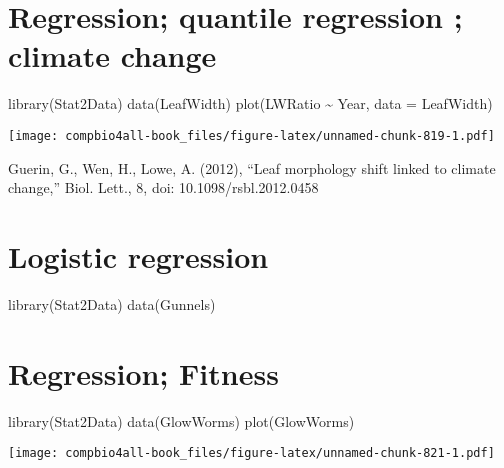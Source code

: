 \documentclass[
]{book}
\newenvironment{Shaded}{\begin{snugshade}}{\end{snugshade}}
\newcommand{\AttributeTok}[1]{\textcolor[rgb]{0.77,0.63,0.00}{#1}}
\newcommand{\FunctionTok}[1]{\textcolor[rgb]{0.00,0.00,0.00}{#1}}
\newcommand{\NormalTok}[1]{#1}
\newcommand{\SpecialCharTok}[1]{\textcolor[rgb]{0.00,0.00,0.00}{#1}}
\begin{document}
\hypertarget{regression-quantile-regression-climate-change}{%
\section{Regression; quantile regression ; climate change}\label{regression-quantile-regression-climate-change}}

\begin{Shaded}
\begin{Highlighting}[]
\FunctionTok{library}\NormalTok{(Stat2Data)}
\FunctionTok{data}\NormalTok{(LeafWidth)}
\FunctionTok{plot}\NormalTok{(LWRatio }\SpecialCharTok{\textasciitilde{}}\NormalTok{ Year, }\AttributeTok{data =}\NormalTok{ LeafWidth)}
\end{Highlighting}
\end{Shaded}

\texttt{[image: compbio4all-book\_files/figure-latex/unnamed-chunk-819-1.pdf]}

Guerin, G., Wen, H., Lowe, A. (2012), ``Leaf morphology shift linked to climate change,'' Biol. Lett., 8, doi: 10.1098/rsbl.2012.0458

\hypertarget{logistic-regression}{%
\section{Logistic regression}\label{logistic-regression}}

\begin{Shaded}
\begin{Highlighting}[]
\FunctionTok{library}\NormalTok{(Stat2Data)}
\FunctionTok{data}\NormalTok{(Gunnels)}
\end{Highlighting}
\end{Shaded}

\hypertarget{regression-fitness}{%
\section{Regression; Fitness}\label{regression-fitness}}

\begin{Shaded}
\begin{Highlighting}[]
\FunctionTok{library}\NormalTok{(Stat2Data)}
\FunctionTok{data}\NormalTok{(GlowWorms)}
\FunctionTok{plot}\NormalTok{(GlowWorms)}
\end{Highlighting}
\end{Shaded}

\texttt{[image: compbio4all-book\_files/figure-latex/unnamed-chunk-821-1.pdf]}
\end{document}
